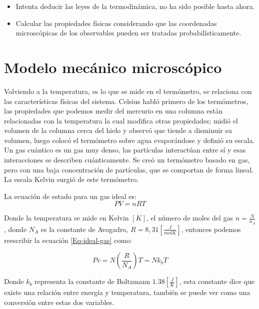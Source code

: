 \documentclass[11pt,fleqn]{book}
\begin{document}
\begin{itemize}
    \item Intenta deducir las leyes de la termodinámica, no ha sido posible hasta ahora.
    \item Calcular las propiedades físicas considerando que las coordenadas microscópicas de los observables pueden ser tratadas probabilísticamente.
\end{itemize}

\section{Modelo mecánico microscópico}

Volviendo a la temperatura, es lo que se mide en el termómetro, se relaciona con las características físicas del sistema. Celsius habló primero de los termómetros, las propiedades que podemos medir del mercurio en una columna están relacionadas con la temperatura la cual modifica otras propiedades; midió el volumen de la columna cerca del hielo y observó que tiende a disminuir su volumen, luego colocó el termómetro sobre agua evaporándose y definió su escala. Un gas cuántico es un gas muy denso, las partículas interactúan entre sí y esas interacciones se describen cuánticamente. Se creó un termómetro basado en gas, pero con una baja concentración de partículas, que se comportan de forma lineal. La escala Kelvin surgió de este termómetro.

La ecuación de estado para un gas ideal es:
\begin{equation}
    PV=nRT
    \label{Eq-ideal-gas}
\end{equation}

Donde la temperatura se mide en Kelvin $[K]$, el número de moles del gas $n=\frac{N}{n_{A}}$, donde $N_{A}$ es la constante de Avogadro, $R=8,31 [\frac{J}{molK}]$, entonces podemos reescribir la ecuación \ref{Eq-ideal-gas} como:

\begin{equation}
    Pv=N\left(\frac{R}{N_{A}}\right)T=Nk_{b}T
\end{equation}

Donde $k_{b}$ representa la constante de Boltzmann $1.38 [\frac{J}{K}]$, esta constante dice que existe una relación entre energía y temperatura, también se puede ver como una conversión entre estas dos variables. 
\end{document}
